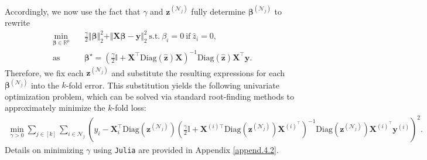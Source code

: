 \documentclass[ijoc,noblindrev]{informs3} %
\let\footnote=\endnote
\begin{document}
Accordingly, we now use the fact that $\gamma$ and $\bm{z}^{(\mathcal{N}_j)}$ fully determine $\bm{\beta}^{(\mathcal{N}_j)}$ to rewrite
\begin{align*}
    \min_{\bm{\beta} \in \mathbb{R}^p} \quad & \frac{\gamma}{2}\Vert \bm{\beta}\Vert_2^2+\Vert \bm{X}\bm{\beta}-\bm{y}\Vert_2^2 \ \text{s.t.} \ \beta_i =0 \ \text{if} \ \hat{z}_i=0,\\
\text{as}\qquad &  \bm{\beta}^\star=\left(\frac{\gamma}{2}\mathbb{I}+\bm{X}^\top \mathrm{Diag}(\hat{\bm{z}})\bm{X}\right)^{-1}\mathrm{Diag}(\hat{\bm{z}})\bm{X}^\top \bm{y}.
\end{align*}
Therefore, we fix each $\bm{z}^{(\mathcal{N}_j)}$ and substitute the resulting expressions for each $\bm{\beta}^{(\mathcal{N}_j)}$ into the $k$-fold error. This substitution yields the following univariate optimization problem, which can be solved via standard root-finding methods to approximately minimize the $k$-fold loss:
\begin{align}\label{prob:newton1}
            \min_{\gamma >0} \sum_{j \in [k]}\sum_{i \in \mathcal{N}_j} \left(y_i-\bm{X}_i^\top \mathrm{Diag}(\bm{z}^{(\mathcal{N}_j)}) \left(\frac{\gamma}{2} \mathbb{I}+\bm{X}^{(i)\top} \mathrm{Diag}(\bm{z}^{(\mathcal{N}_j)})\bm{X}^{(i)^\top}\right)^{-1}\mathrm{Diag}(\bm{z}^{(\mathcal{N}_j)})\bm{X}^{{(i)}^\top} \bm{y}^{(i)}\right)^2.
\end{align}
Details on minimizing $\gamma$ using \verb|Julia| are provided in Appendix \ref{append.4.2}.
\end{document}
